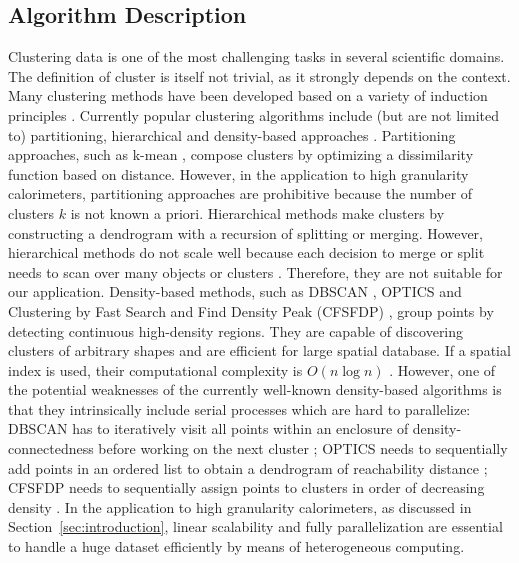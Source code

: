 \subsection{Algorithm Description}
\label{sec:algorithm}
Clustering data is one of the most challenging tasks in several scientific domains. The definition of cluster is itself not trivial, as it strongly depends on the context. Many clustering methods have been developed based on a variety of induction principles \cite{maimon2005data}. Currently popular clustering algorithms include (but are not limited to) partitioning, hierarchical and density-based approaches \cite{maimon2005data,han2011data}. Partitioning approaches, such as k-mean \cite{lloyd1982least}, compose clusters by optimizing a dissimilarity function based on distance. However, in the application to high granularity calorimeters, partitioning approaches are prohibitive because the number of clusters $k$ is not known a priori. Hierarchical methods make clusters by constructing a dendrogram with a recursion of splitting or merging. However, hierarchical methods do not scale well because each decision to merge or split needs to scan over many objects or clusters \cite{han2011data}. Therefore, they are not suitable for our application. Density-based methods, such as DBSCAN \cite{Ester:1996:DAD:3001460.3001507}, OPTICS \cite{Ankerst:1999:OOP:304182.304187} and Clustering by Fast Search and Find Density Peak (CFSFDP) \cite{rodriguez2014clustering}, group points by detecting continuous high-density regions. They are capable of discovering clusters of arbitrary shapes and are efficient for large spatial database. If a spatial index is used, their computational complexity is $O(n\log n)$ \cite{han2011data}. However, one of the potential weaknesses of the currently well-known density-based algorithms is that they intrinsically include serial processes which are hard to parallelize: DBSCAN has to iteratively visit all points within an enclosure of density-connectedness before working on the next cluster \cite{Ester:1996:DAD:3001460.3001507}; OPTICS needs to sequentially add points in an ordered list to obtain a dendrogram of reachability distance \cite{Ankerst:1999:OOP:304182.304187}; CFSFDP needs to sequentially assign points to clusters in order of decreasing density \cite{rodriguez2014clustering}. In the application to high granularity calorimeters, as discussed in Section~\ref{sec:introduction}, linear scalability and fully parallelization are essential to handle a huge dataset efficiently by means of heterogeneous computing.


